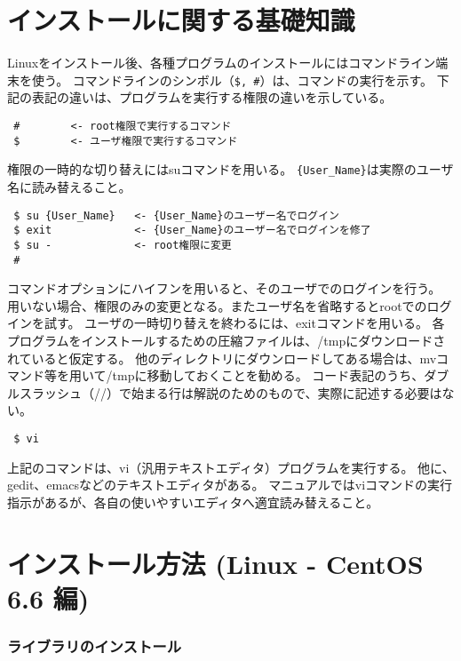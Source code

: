 \section{インストールに関する基礎知識}

Linuxをインストール後、各種プログラムのインストールにはコマンドライン端末を使う。
コマンドラインのシンボル（\verb|$, #|）は、コマンドの実行を示す。
下記の表記の違いは、プログラムを実行する権限の違いを示している。

\begin{verbatim}
 #        <- root権限で実行するコマンド
 $        <- ユーザ権限で実行するコマンド
\end{verbatim}
権限の一時的な切り替えにはsuコマンドを用いる。
\verb|{User_Name}|は実際のユーザ名に読み替えること。
\begin{verbatim}
 $ su {User_Name}   <- {User_Name}のユーザー名でログイン
 $ exit             <- {User_Name}のユーザー名でログインを修了
 $ su -             <- root権限に変更
 #
\end{verbatim}

コマンドオプションにハイフンを用いると、そのユーザでのログインを行う。
用いない場合、権限のみの変更となる。またユーザ名を省略するとrootでのログインを試す。
ユーザの一時切り替えを終わるには、exitコマンドを用いる。
各プログラムをインストールするための圧縮ファイルは、/tmpにダウンロードされていると仮定する。
他のディレクトリにダウンロードしてある場合は、mvコマンド等を用いて/tmpに移動しておくことを勧める。
コード表記のうち、ダブルスラッシュ（//）で始まる行は解説のためのもので、実際に記述する必要はない。


\begin{verbatim}
 $ vi
\end{verbatim}

上記のコマンドは、vi（汎用テキストエディタ）プログラムを実行する。
他に、gedit、emacsなどのテキストエディタがある。
マニュアルではviコマンドの実行指示があるが、各自の使いやすいエディタへ適宜読み替えること。


\section{インストール方法 (Linux - CentOS 6.6 編)}

\subsubsection{ライブラリのインストール}

